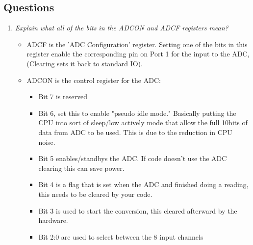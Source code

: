 \documentclass[11pt]{article}
\begin{document}
\begin{preview}
\section{Questions}
\begin{enumerate}
        \item \textit{Explain what all of the bits in the ADCON and ADCF registers mean?} \\
        \begin{itemize}
                \item ADCF is the 'ADC Configuration' register. Setting one of the bits in this register enable the corresponding pin on Port 1 for the input to the ADC, (Clearing sets it back to standard IO).
                \item ADCON is the control register for the ADC:
                \begin{itemize}
                        \item Bit 7 is reserved
                        \item Bit 6, set this to enable "pseudo idle mode." Basically putting the CPU into sort of sleep/low actively mode that allow the full 10bits of data from ADC to be used. This is due to the reduction in CPU noise.
                        \item Bit 5 enables/standbys the ADC. If code doesn't use the ADC clearing this can save power.
                        \item Bit 4 is a flag that is set when the ADC and finished doing a reading, this needs to be cleared by your code.
                        \item Bit 3 is used to start the conversion, this cleared afterward by the hardware.
                        \item Bit 2:0 are used to select between the 8 input channels
                \end{itemize} 
        \end{itemize}

\end{enumerate}

\end{preview}
\end{document}
